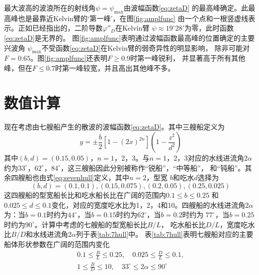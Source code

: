 最大波高的波浪所在的射线角$\psi=\psi_{\max}$由波幅函数\eqref{eq:zetaD}
的最高峰确定。此最高峰也是最靠近Kelvin臂的`第一峰'，在图\ref{fig:amplfunc}
由一个点和一根竖虚线表示。正如已经指出的，二阶导数$\varphi''_D$在Kelvin臂
$\psi\approx19^\circ28'$为零，此时函数\eqref{eq:zetaD}是无界的。
图\ref{fig:amplfunc}表明通过波幅函数最高峰的位置确定的主要兴波角
$\psi_{\max}$不受函数\eqref{eq:zetaD}在Kelvin臂的弱奇异性的明显影响，
除非可能对$F=0.65$。图\ref{fig:amplfunc}还表明$F\ge0.9$时第一峰锐利，
并显著高于所有其他峰，但在$F\le0.7$时第一峰较宽，并且高出其他峰不多。

\section{数值计算}
\label{sec:numcomput}

现在考虑由七艘船产生的散波的波幅函数\eqref{eq:zetaD}。其中三艘船定义为
\begin{equation}
  y=\pm\frac{b}{2}[1-(2x)^{2n}]\left(1-\frac{z^2}{d^2}\right)
  \label{eq:sevenhull}
\end{equation}
其中$(b,d)=(0.15,0.05)$，$n=1$，2，3。与$n=1$，2，3对应的水线进流角$2\alpha$
约为$33^\circ$，$62^\circ$，$84^\circ$，这三艘船因此分别被称作``锐船''，``中等船''，
和``钝船''。其余四艘船也由式\eqref{eq:sevenhull}定义，其中$n=2$，型宽
$b$和吃水$d$选择为
\begin{equation}
  (b,d)=(0.1,0.1),(0.15,0.075),(0.2,0.05),(0.25,0.025)
  \label{eq:bd4hull}
\end{equation}
这四艘船的型宽船长比和吃水船长比在广阔的范围内$0.1\le b\le0.25$
和$0.025\le d\le0.1$变化，对应的宽度吃水比为1，2，4和10。四艘船的水线进流角$2\alpha$
为：当$b=0.1$时约为$44^\circ$，当$b=0.15$时约为$62^\circ$，当$b=0.2$时约为
$77^\circ$，当$b=0.25$时约为$90^\circ$。计算中考虑的七艘船的型宽船长比$B/L$，
吃水船长比$D/L$，宽度吃水比$B/D$和水线进流角$2\alpha$列于表\ref{tab:7hull}中。
表\ref{tab:7hull}表明七艘船对应的主要船体形状参数在广阔的范围内变化
  \begin{equation}
    \label{eq:shaparam}
  \left.
  \begin{array}{l}
  0.1\le\frac{B}{L}\le0.25,\quad 0.025\le\frac{D}{L}\le 0.1,\\
  1\le\frac{B}{D}\le10,\quad 33^\circ\le2\alpha\le90^\circ
  \end{array}
  \right.
  \end{equation}
